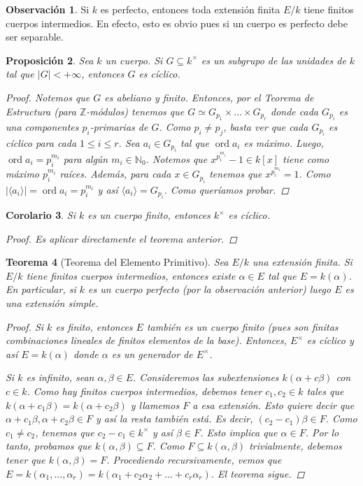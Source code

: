 \documentclass[12pt]{book}
\newtheorem{teo}{Teorema}[section]
\newtheorem{prop}[teo]{Proposición}
\newtheorem{cor}[teo]{Corolario}
\theoremstyle{definition}
\newtheorem{obs}[teo]{Observación}
\newcommand{\ZZ}{\mathbb{Z}}      %
\newcommand{\NN}{\mathbb{N}}
\DeclareMathOperator{\ord}{ord}
\begin{document}
\begin{obs}
Si $k$ es perfecto, entonces toda extensión finita $E/k$ tiene finitos cuerpos intermedios. En efecto, esto es obvio pues si un cuerpo es perfecto debe ser separable.
\end{obs}

\begin{prop}
Sea $k$ un cuerpo.  Si $G\subseteq k^\times$ es un subgrupo de las unidades de $k$ tal que $|G|<+\infty$, entonces $G$ es cíclico.
\begin{proof}
Notemos que $G$ es abeliano y finito. Entonces, por el Teorema de Estructura (para $\ZZ$-módulos) tenemos que $G\simeq G_{p_1}\times\ldots\times G_{p_r}$ donde cada $G_{p_i}$ es una componentes $p_i$-primarias de $G$. Como $p_i\neq p_j$, basta ver que cada $G_{p_i}$ es cíclico para cada $1\leq i\leq r$. Sea $a_i\in G_{p_i}$ tal que $\ord a_i$ es máximo. Luego, $\ord a_i = p_i^{m_i}$ para algún $m_i\in\NN_0$. Notemos que $x^{p_i^{m_i}}-1\in k[x]$ tiene como máximo $p_i^{m_i}$ raíces. Además, para cada $x\in G_{p_i}$ tenemos que $x^{p_i^{m_i}}=1$. Como $|\langle a_i\rangle| = \ord a_i = p_i^{m_i}$ y así $\langle a_i\rangle = G_{p_i}$. Como queríamos probar.
\end{proof}
\end{prop}

\begin{cor}
Si $k$ es un cuerpo finito, entonces $k^\times$ es cíclico.
\begin{proof}
Es aplicar directamente el teorema anterior.
\end{proof}
\end{cor}

\begin{teo}[Teorema del Elemento Primitivo]
Sea $E/k$ una extensión finita. Si $E/k$ tiene finitos cuerpos intermedios, entonces existe $\alpha\in E$ tal que $E=k(\alpha)$. En particular, si $k$ es un cuerpo perfecto (por la observación anterior) luego $E$ es una extensión simple.
\begin{proof}
Si $k$ es finito, entonces $E$ también es un cuerpo finito (pues son finitas combinaciones lineales de finitos elementos de la base). Entonces, $E^\times$ es cíclico y así $E=k(\alpha)$ donde $\alpha$ es un generador de $E^\times$.

Si $k$ es infinito, sean $\alpha,\beta\in E$. Consideremos las subextensiones $k(\alpha+c\beta)$ con $c\in k$. Como hay finitos cuerpos intermedios, debemos tener $c_1,c_2\in k$ tales que $k(\alpha + c_1\beta) = k(\alpha + c_2\beta)$ y llamemos $F$ a esa extensión. Esto quiere decir que $\alpha + c_1\beta, \alpha+c_2\beta\in F$ y así la resta también está. Es decir, $(c_2-c_1)\beta \in F$. Como $c_1\neq c_2$, tenemos que $c_2 - c_1 \in k^\times$ y así $\beta\in F$. Esto implica que $\alpha\in F$. Por lo tanto, probamos que $k(\alpha,\beta)\subseteq F$. Como $F\subseteq k(\alpha,\beta)$ trivialmente,  debemos tener que $k(\alpha,\beta) = F$. Procediendo recursivamente, vemos que $E=k(\alpha_1,\ldots,\alpha_r) = k(\alpha_1 + c_2\alpha_2 + \ldots + c_r\alpha_r)$. El teorema sigue.
\end{proof}
\end{teo}
\end{document}
